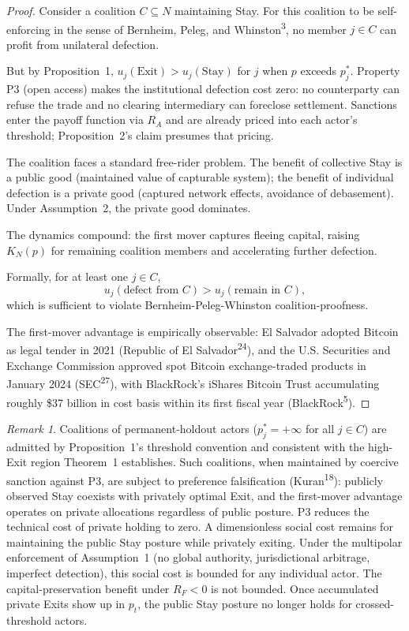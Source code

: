 \documentclass[12pt]{article}
\theoremstyle{definition}
\theoremstyle{remark}
\newtheorem*{remark}{Remark}
\begin{document}
\begin{proof}
Consider a coalition $C \subseteq N$ maintaining Stay. For this
coalition to be self-enforcing in the sense of Bernheim, Peleg, and
Whinston\textsuperscript{3}, no member $j \in C$ can profit from
unilateral defection.

But by Proposition~1, $u_j(\text{Exit}) > u_j(\text{Stay})$ for $j$
when $p$ exceeds $p_j^*$. Property P3 (open access)
makes the institutional defection cost zero: no counterparty can
refuse the trade and no clearing intermediary can foreclose
settlement. Sanctions enter the payoff function via $R_A$ and are already priced into each actor's threshold; Proposition~2's claim presumes that pricing.

The coalition faces a standard free-rider problem. The benefit of
collective Stay is a public good (maintained value of capturable
system); the benefit of individual defection is a private good
(captured network effects, avoidance of debasement). Under
Assumption~2, the private good dominates.

The dynamics compound: the first mover captures fleeing
capital, raising $K_N(p)$ for remaining coalition members and
accelerating further defection.

Formally, for at least one $j \in C$,
\[
u_j(\text{defect from } C) > u_j(\text{remain in } C),
\]
which is sufficient to violate Bernheim-Peleg-Whinston
coalition-proofness.

The first-mover advantage is empirically observable: El Salvador adopted Bitcoin as legal tender in 2021 (Republic of El Salvador\textsuperscript{24}), and the U.S. Securities and Exchange Commission approved spot Bitcoin exchange-traded products in January 2024 (SEC\textsuperscript{27}), with BlackRock's iShares Bitcoin Trust accumulating roughly \$37 billion in cost basis within its first fiscal year (BlackRock\textsuperscript{5}).
\end{proof}

\begin{remark}
Coalitions of permanent-holdout actors ($p_j^* = +\infty$ for all
$j \in C$) are admitted by Proposition~1's threshold convention
and consistent with the high-Exit region Theorem~1 establishes.
Such coalitions, when maintained by coercive sanction against P3,
are subject to preference falsification
(Kuran\textsuperscript{18}): publicly observed Stay coexists with
privately optimal Exit, and the first-mover advantage operates on
private allocations regardless of public posture. P3 reduces the technical cost of private holding to zero. A dimensionless social cost remains for maintaining the public Stay posture while privately exiting. Under the multipolar enforcement of Assumption~1 (no global authority, jurisdictional arbitrage, imperfect detection), this social cost is bounded for any individual actor. The capital-preservation benefit under $R_F < 0$ is not bounded. Once
accumulated private Exits show up in $p_t$, the public Stay
posture no longer holds for crossed-threshold actors.
\end{remark}
\end{document}
